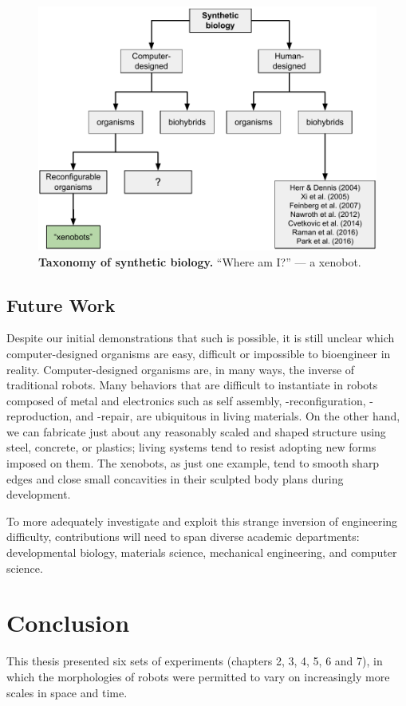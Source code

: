 \begin{figure}
    \centering
    \includegraphics[width=\linewidth]{fig/synthbio.pdf}
    \vspace{1pt}
    \caption{%
    \textbf{Taxonomy of synthetic biology.}
    ``Where am I?'' --- a xenobot.
    \label{fig:synthbio}%
    }
\end{figure}


\subsection{Future Work}

Despite our initial demonstrations that such is possible, 
it is still unclear which computer-designed organisms are easy, difficult or impossible to bioengineer in reality.
Computer-designed organisms are, in many ways, the inverse of traditional robots.
Many behaviors that are difficult to instantiate in robots composed of metal and electronics such as self assembly, -reconfiguration, -reproduction, and -repair, are ubiquitous in living materials.
On the other hand, we can fabricate just about any reasonably scaled and shaped structure using steel, concrete, or plastics; living systems tend to resist adopting new forms imposed on them.
The xenobots, as just one example, tend to smooth sharp edges and close small concavities in their sculpted body plans during development.

To more adequately investigate and exploit this strange inversion of engineering difficulty, contributions will need to span diverse academic departments: developmental biology, materials science, mechanical engineering, and computer science.



\section{Conclusion}

This thesis presented six sets of experiments (chapters 2, 3, 4, 5, 6 and 7), in which the morphologies of robots were permitted to vary on increasingly more scales in space and time.

